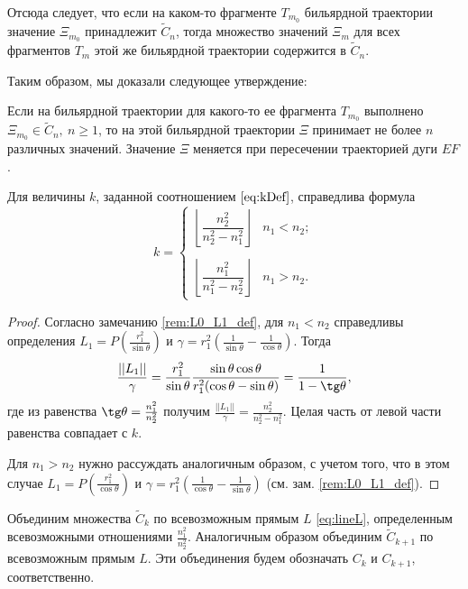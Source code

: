 Отсюда следует, что если на каком-то  фрагменте $T_{m_0}$ бильярдной траектории  значение $\Xi_{m_0}$ принадлежит $\widetilde{C}_n$, тогда множество значений $\Xi_m$ для всех фрагментов $T_m$ этой же бильярдной траектории содержится в $\widetilde{C}_n$.

Таким образом, мы доказали следующее утверждение:
\begin{statement}
Если на  бильярдной траектории для какого-то ее фрагмента $T_{m_0}$  выполнено $\Xi_{m_0} \in \widetilde{C}_n, \ n\geq 1$, то на этой бильярдной траектории  $\Xi$ принимает не более $n$ различных значений. Значение $\Xi$ меняется при пересечении траекторией дуги $EF$.
\end{statement}

\begin{statement}
Для величины $k$, заданной соотношением $\eqref{eq:kDef}$, справедлива формула 
\[
k=\left\{
\begin{array}{ll}
\left\lfloor \dfrac{n_2^2}{n_2^2-n_1^2} \right\rfloor & n_1<n_2; \\
\\
\left\lfloor \dfrac{n_1^2}{n_1^2-n_2^2} \right\rfloor & n_1>n_2.
\end{array}
\right.
\]
\end{statement}
\begin{proof}
Согласно замечанию \ref{rem:L0_L1_def}, для $n_1<n_2$ справедливы определения $L_1 = P(\frac{r_1^2}{\sin \theta})$ и $\gamma = r_1^2 \left( \frac{1}{\sin \theta} - \frac{1}{\cos \theta}  \right)$.
Тогда 
$$\frac{||L_1||}{\gamma} = \frac{r_1^2}{\sin \theta} \frac{\sin \theta \cos \theta}{r_1^2 (\cos \theta - \sin \theta)} = \frac{1}{1-\tg \theta},$$
где из равенства $\tg \theta = \frac{n_1^2}{n_2^2}$ получим $\frac{||L_1||}{\gamma} = \frac{n_2^2}{n_2^2-n_1^2}$. Целая часть от левой части равенства совпадает с $k$.

Для $n_1>n_2$ нужно рассуждать аналогичным образом, с учетом того, что в этом случае $L_1 = P(\frac{r_1^2}{\cos \theta})$ и $\gamma = r_1^2 \left( \frac{1}{\cos \theta} - \frac{1}{\sin \theta}  \right)$ (см. зам. \ref{rem:L0_L1_def}).
\end{proof}

Объединим множества $\widetilde{C}_k$ по всевозможным прямым $L$ \eqref{eq:lineL}, определенным всевозможными отношениями $\frac{n_1^2}{n_2^2}$. Аналогичным образом объединим $\widetilde{C}_{k+1}$ по всевозможным прямым $L$. Эти объединения будем обозначать $C_k$ и $C_{k+1}$, соответственно.

